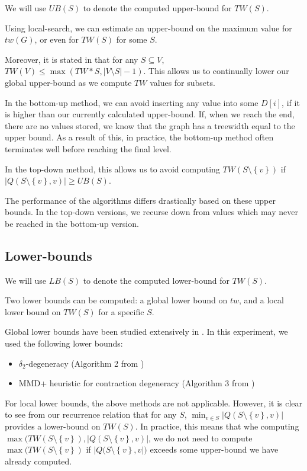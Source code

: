 \documentclass{article}
\newcommand\abs[1]{\left|#1\right|}
\newcommand\set[1]{\left\{#1\right\}}
\begin{document}
We will use $UB(S)$ to denote the computed upper-bound for $TW(S)$.

Using local-search, we can estimate an upper-bound on the maximum
value for $tw(G)$, or even for $TW(S)$ for some $S$.

Moreover, it is stated in \cite{exact} that for any $S \subseteq V$,
$TW(V) \leq \max(TW*S, \abs{V \setminus S} -1)$. This allows us to continually lower our
global upper-bound as we compute $TW$ values for subsets.

In the bottom-up method, we can avoid inserting any value into some $D[i]$,
if it is higher than our currently calculated upper-bound. If, when we reach the end,
there are no values stored, we know that the graph has a treewidth equal to the upper bound.
As a result of this, in practice, the bottom-up method often terminates well before
reaching the final level.

In the top-down method, this allows us to avoid computing $TW(S \setminus \set{v})$
if $\abs{Q(S \setminus \set{v}, v)} \geq UB(S)$.

The performance of the algorithms differs drastically based on these upper bounds.
In the top-down versions, we recurse down from values which may never be reached in the bottom-up version.


\subsection{Lower-bounds}

We will use $LB(S)$ to denote the computed lower-bound for $TW(S)$.

Two lower bounds can be computed: a global lower bound on $tw$,
and a local lower bound on $TW(S)$ for a specific $S$.

Global lower bounds have been studied extensively in \cite{lowerBound}.
In this experiment, we used the following lower bounds:

\begin{itemize}
\item $\delta_2$-degeneracy (Algorithm 2 from \cite{lowerBound})
\item MMD+ heuristic for contraction degeneracy (Algorithm 3 from \cite{lowerBound})
\end{itemize}

For local lower bounds, the above methods are not applicable.
However, it is clear to see from our recurrence relation that for any $S$,
$\min_{v \in S} \abs{Q(S \setminus \set{v}, v)}$
provides a lower-bound on $TW(S)$.
In practice, this means that whe computing  $\max(TW(S \setminus \set{v}), \abs{Q(S \setminus \set{v}, v)}$,
we do not need to compute $\max(TW(S \setminus \set{v})$ if $\abs{Q(S \setminus \set{v}, v})$ exceeds some upper-bound
we have already computed.
\end{document}
